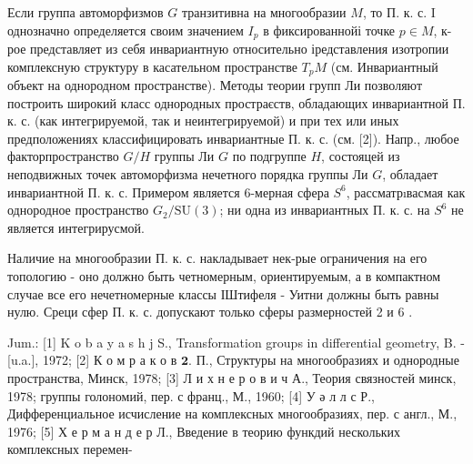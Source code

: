 \documentclass[10pt]{article}
\begin{document}
Если группа автоморфизмов $G$ транзитивна на многообразии $M$, то П. к. с. I однозначно определяется своим значением $I_{p}$ в фиксированнойі точке $p \in M$, к-рое представляет из себя инвариантную относительно іредставления изотропии комплексную структуру в касательном пространстве $T_{p} M$ (см. Инвариантный объект на однородном пространстве). Методы теории групп Ли позволяют построить широкий класс однородных простраєств, обладающих инвариантной П. к. с. (как интегрируемой, так и неинтегрируемой) и при тех или иных предположениях классифицировать инвариантные П. к. с. (см. [2]). Напр., любое факторпространство $G / H$ группы Ли $G$ по подгруппе $H$, состояцей из неподвижных точек автоморфизма нечетного порядка группы Ли $G$, обладает инвариантной П. к. с. Примером является 6-мерная сфера $S^{6}$, рассматрıвасмая как однородное пространство $G_{2} / \mathrm{SU}(3)$; ни одна из инвариантных П. к. с. на $S^{6}$ не является интегрирусмой.



Наличие на многообразии П. к. с. накладывает нек-рые ограничения на его топологию - оно должно быть четномерным, ориентируемым, а в компактном случае все его нечетномерные классы ІШтифеля - Уитни должны быть равны нулю. Среци сфер П. к. с. допускают только сферы размерностей 2 и 6 .



Jum.: [1] K o b a y a s h $\mathrm{j}$ S., Transformation groups in differential geometry, B. - [u.a.], 1972; [2] К о м р а к о в $\mathbf{2}$. П., Структуры на многообразиях и однородные пространства, Минск, 1978; [3] Л и х н е р о в и ч А., Теория связностей минск, 1978; группы голономий, пер. с франц., М., 1960; [4] У ә л л с Р., Дифференциальное исчисление на комплексных многообразиях, пер. с англ., М., 1976; [5] Х е р м а н д е р Л., Введение в теорию функдий нескольких комплексных перемен-
\end{document}
